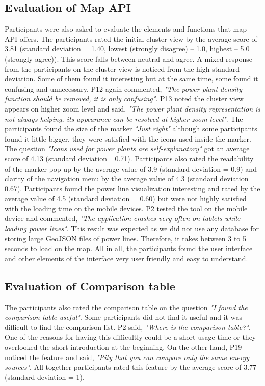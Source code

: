 \subsection*{Evaluation of Map API}

Participants were also asked to evaluate the elements and functions that map API offers. The participants rated the initial cluster view by the average score of 3.81 (standard deviation = 1.40, lowest (strongly disagree) – 1.0, highest – 5.0 (strongly agree)). This score falls between neutral and agree. A mixed response from the participants on the cluster view is noticed from the high standard deviation. Some of them found it interesting but at the same time, some found it confusing and unnecessary. P12 again commented, \textit{"The power plant density function should be removed, it is only confusing"}. P13 noted the cluster view appears on higher zoom level and said, \textit{"The power plant density representation is not always helping, its appearance can be resolved at higher zoom level"}. The participants found the size of the marker \textit{"Just right"} although some participants found it little bigger, they were satisfied with the icons used inside the marker. The question \textit{"Icons used for power plants are self-explanatory"} got an average score of 4.13 (standard deviation =0.71). Participants also rated the readability of the marker pop-up by the average value of 3.9 (standard deviation = 0.9) and clarity of the navigation menu by the average value of 4.3 (standard deviation = 0.67). Participants found the power line visualization interesting and rated by the average value of 4.5 (standard deviation = 0.60) but were not highly satisfied with the loading time on the mobile devices. P2 tested the tool on the mobile device and commented, \textit{"The application crashes very often on tablets while loading power lines"}. This result was expected as we did not use any database for storing large GeoJSON files of power lines. Therefore, it takes between 3 to 5 seconds to load on the map. All in all, the participants found the user interface and other elements of the interface very user friendly and easy to understand.

\subsection*{Evaluation of Comparison table}

The participants also rated the comparison table on the question \textit{"I found the comparison table useful"}. Some participants did not find it useful and it was difficult to find the comparison list.  P2 said, \textit{"Where is the comparison table?"}. One of the reasons for having this difficultly could be a short usage time or they overlooked the short introduction at the beginning. On the other hand, P19 noticed the feature and said, \textit{"Pity that you can compare only the same energy sources"}. All together participants rated this feature by the average score of 3.77 (standard deviation = 1).

